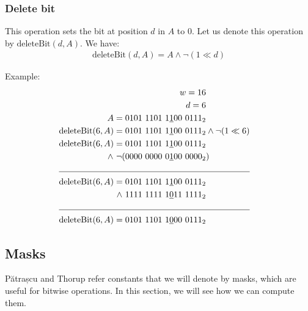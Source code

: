 \subsubsection{Delete bit}
This operation sets the bit at position $d$ in $A$ to $0$. Let us denote this operation by $\text{deleteBit}(d, A)$. We have:
\begin{align*}
    \text{deleteBit}(d, A) = A \wedge \neg(1 \ll d)
\end{align*}

Example:
\begin{align*}
    w = 16\\
    d = 6\\
    A = 0101\ 1101\ 1\underline{1}00\ 0111_2& \\
    \text{deleteBit}(6,A) = 0101\ 1101\ 1\underline{1}00\ 0111_2& \wedge \neg(1 \ll 6) \\
    \text{deleteBit}(6,A) = 0101\ 1101\ 1\underline{1}00\ 0111_2&\\
    \wedge\ \neg(0000\ 0000\ 0\underline{1}00\ 0000_2&) \\
    \cline{1-2}
    \text{deleteBit}(6,A) = 0101\ 1101\ 1\underline{1}00\ 0111_2& \\
    \wedge\ 1111\ 1111\ 1\underline{0}11\ 1111_2 \\
    \cline{1-2}
    \text{deleteBit}(6,A) = 0101\ 1101\ 1\underline{0}00\ 0111_2&
\end{align*}

\subsection{Masks} \label{sec:masks}

Pătrașcu and Thorup refer constants that we will denote by masks, which are useful for bitwise operations. In this section, we will see how we can compute them.

